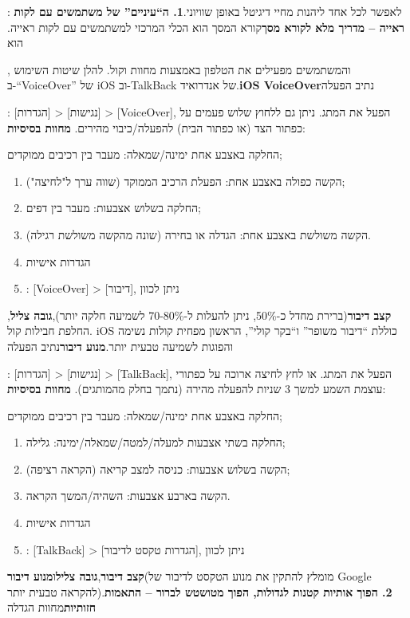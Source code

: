 
: לאפשר לכל אחד ליהנות מחיי דיגיטל באופן שוויוני.\textbf{1. ה“עיניים” של משתמשים עם לקות ראייה – מדריך מלא לקורא מסך}קורא המסך הוא הכלי המרכזי למשתמשים עם לקות ראייה. הוא


, והמשתמשים מפעילים את הטלפון באמצעות מחוות וקול. להלן שיטות השימוש ב-“VoiceOver” של iOS וב-TalkBack של אנדרואיד.\textbf{iOS VoiceOver}נתיב הפעלה

\begin{tcbinfo}{: [הגדרות] > [נגישות] > [VoiceOver], הפעל את המתג. ניתן גם ללחוץ שלוש פעמים על כפתור הצד (או כפתור הבית) להפעלה/כיבוי מהירים.}
\textbf{מחוות בסיסיות}:

החלקה באצבע אחת ימינה/שמאלה: מעבר בין רכיבים ממוקדים;

\begin{enumerate}
  \item הקשה כפולה באצבע אחת: הפעלת הרכיב הממוקד (שווה ערך ל"לחיצה");
  \item החלקה בשלוש אצבעות: מעבר בין דפים;
  \item הקשה משולשת באצבע אחת: הגדלה או בחירה (שונה מהקשה משולשת רגילה).
  \item הגדרות אישיות
  \item : [VoiceOver] > [דיבור], ניתן לכוון
\end{enumerate}

\textbf{קצב דיבור}(ברירת מחדל כ-50\%, ניתן להעלות ל-70-80\% לשמיעה חלקה יותר),\textbf{גובה צליל}, החלפת חבילות קול. iOS כוללת “דיבור משופר” ו“בקר קולי”, הראשון מפחית קולות נשימה והפוגות לשמיעה טבעית יותר.\textbf{מנוע דיבור}נתיב הפעלה

\end{tcbinfo}

\begin{tcbinfo}{: [הגדרות] > [נגישות] > [TalkBack], הפעל את המתג. או לחץ לחיצה ארוכה על כפתורי עוצמת השמע למשך 3 שניות להפעלה מהירה (נתמך בחלק מהמותגים).}
\textbf{מחוות בסיסיות}:

החלקה באצבע אחת ימינה/שמאלה: מעבר בין רכיבים ממוקדים;

\begin{enumerate}
  \item החלקה בשתי אצבעות למעלה/למטה/שמאלה/ימינה: גלילה;
  \item הקשה בשלוש אצבעות: כניסה למצב קריאה (הקראה רציפה);
  \item הקשה בארבע אצבעות: השהיה/המשך הקראה.
  \item הגדרות אישיות
  \item : [TalkBack] > [הגדרות טקסט לדיבור], ניתן לכוון
\end{enumerate}

\textbf{קצב דיבור},\textbf{גובה צליל}ו\textbf{מנוע דיבור}(מומלץ להתקין את מנוע הטקסט לדיבור של Google להקראה טבעית יותר).\textbf{2. הפוך אותיות קטנות לגדולות, הפוך מטושטש לברור – התאמות חזותיות}מחוות הגדלה

\end{tcbinfo}

